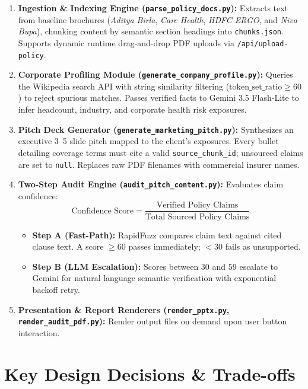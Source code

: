 \documentclass[11pt,a4paper]{article}
\begin{document}
\begin{enumerate}
    \item \textbf{Ingestion \& Indexing Engine (\texttt{parse\_policy\_docs.py}):} Extracts text from baseline brochures (\textit{Aditya Birla}, \textit{Care Health}, \textit{HDFC ERGO}, and \textit{Niva Bupa}), chunking content by semantic section headings into \texttt{chunks.json}. Supports dynamic runtime drag-and-drop PDF uploads via \texttt{/api/upload-policy}.
    \item \textbf{Corporate Profiling Module (\texttt{generate\_company\_profile.py}):} Queries the Wikipedia search API with string similarity filtering ($\text{token\_set\_ratio} \ge 60$) to reject spurious matches. Passes verified facts to Gemini 3.5 Flash-Lite to infer headcount, industry, and corporate health risk exposures.
    \item \textbf{Pitch Deck Generator (\texttt{generate\_marketing\_pitch.py}):} Synthesizes an executive 3--5 slide pitch mapped to the client's exposures. Every bullet detailing coverage terms must cite a valid \texttt{source\_chunk\_id}; unsourced claims are set to \texttt{null}. Replaces raw PDF filenames with commercial insurer names.
    \item \textbf{Two-Step Audit Engine (\texttt{audit\_pitch\_content.py}):} Evaluates claim confidence:
    \begin{equation*}
        \text{Confidence Score} = \frac{\text{Verified Policy Claims}}{\text{Total Sourced Policy Claims}}
    \end{equation*}
    \begin{itemize}
        \item \textbf{Step A (Fast-Path):} RapidFuzz compares claim text against cited clause text. A score $\ge 60$ passes immediately; $<30$ fails as unsupported.
        \item \textbf{Step B (LLM Escalation):} Scores between $30$ and $59$ escalate to Gemini for natural language semantic verification with exponential backoff retry.
    \end{itemize}
    \item \textbf{Presentation \& Report Renderers (\texttt{render\_pptx.py}, \texttt{render\_audit\_pdf.py}):} Render output files on demand upon user button interaction.
\end{enumerate}

\section{Key Design Decisions \& Trade-offs}
\end{document}
